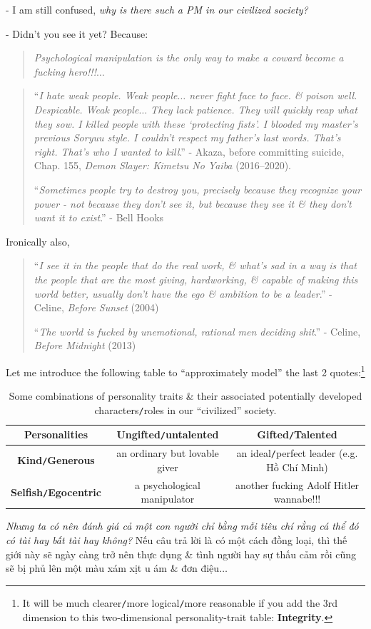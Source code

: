 \documentclass[12pt]{article}
\begin{document}
- I am still confused, {\it why is there such a PM in our civilized society?}

- Didn't you see it yet? Because:
\begin{quotation}
	{\it Psychological manipulation is the only way to make a coward become a fucking hero!!!}$\ldots$
\end{quotation}

\begin{quotation}
	``{\it I hate weak people. Weak people$\ldots$ never fight face to face. \& poison well. Despicable. Weak people$\ldots$ They lack patience. They will quickly reap what they sow. I killed people with these `protecting fists'. I blooded my master's previous Soryuu style. I couldn't respect my father's last words. That's right. That's who I wanted to kill}.'' - Akaza, before committing suicide, Chap. 155, {\it Demon Slayer: Kimetsu No Yaiba} (2016--2020).
	
	``{\it Sometimes people try to destroy you, precisely because they recognize your power - not because they don't see it, but because they see it \& they don't want it to exist}.'' - Bell Hooks
\end{quotation}
Ironically also,

\begin{quotation}
	``{\it I see it in the people that do the real work, \& what's sad in a way is that the people that are the most giving, hardworking, \& capable of making this world better, usually don't have the ego \& ambition to be a leader}.'' - Celine, {\it Before Sunset} (2004)
	
	``{\it The world is fucked by unemotional, rational men deciding shit}.'' - Celine, {\it Before Midnight} (2013)
\end{quotation}
Let me introduce the following table to ``approximately model'' the last 2 quotes:\footnote{It will be much clearer{\tt/}more logical{\tt/}more reasonable if you add the 3rd dimension to this two-dimensional personality-trait table: \textbf{Integrity}.}

\begin{table}[h]
	\centering
	\begin{tabular}{|c|c|c|}
		\hline
		{\sc Personalities}& \textbf{Ungifted{\tt/}untalented} & \textbf{Gifted{\tt/}Talented} \\
		\hline
		\textbf{Kind{\tt/}Generous} & an ordinary but lovable giver & an ideal{\tt/}perfect leader (e.g. Hồ Chí Minh) \\
		\hline
		\textbf{Selfish{\tt/}Egocentric} & a psychological manipulator & another fucking Adolf Hitler wannabe!!! \\
		\hline
	\end{tabular}
	\caption{Some combinations of personality traits \& their associated potentially developed characters{\tt/}roles in our ``civilized'' society.}
\end{table}
{\it Nhưng ta có nên đánh giá cả một con người chỉ bằng mỗi tiêu chí rằng cá thể đó có tài hay bất tài hay không?} Nếu câu trả lời là có một cách đồng loại, thì thế giới này sẽ ngày càng trở nên thực dụng \& tình người hay sự thấu cảm rồi cũng sẽ bị phủ lên một màu xám xịt u ám \& đơn điệu$\ldots$
\end{document}
